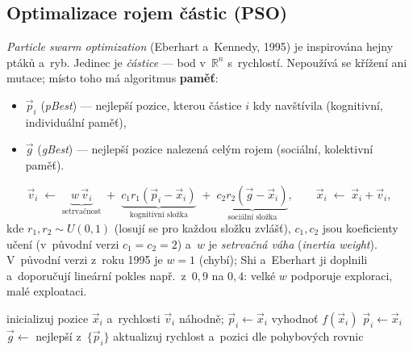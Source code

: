 \documentclass[11pt,a4paper]{article}
\theoremstyle{definition}
\begin{document}
\subsection{Optimalizace rojem částic (PSO)}

\emph{Particle swarm optimization} (Eberhart a~Kennedy, 1995) je inspirována
hejny ptáků a~ryb. Jedinec je \emph{částice} --- bod v~$\mathbb{R}^n$
s~rychlostí. Nepoužívá se křížení ani mutace; místo toho má algoritmus
\textbf{paměť}:
\begin{itemize}
\item $\vec p_i$ (\emph{pBest}) --- nejlepší pozice, kterou částice $i$
  kdy navštívila (kognitivní, individuální paměť),
\item $\vec g$ (\emph{gBest}) --- nejlepší pozice nalezená celým rojem
  (sociální, kolektivní paměť).
\end{itemize}

\begin{defbox}
\[
\vec v_i \;\gets\; \underbrace{w\,\vec v_i}_{\text{setrvačnost}}
\;+\; \underbrace{c_1 r_1 (\vec p_i - \vec x_i)}_{\text{kognitivní složka}}
\;+\; \underbrace{c_2 r_2 (\vec g - \vec x_i)}_{\text{sociální složka}},
\qquad
\vec x_i \;\gets\; \vec x_i + \vec v_i ,
\]
kde $r_1, r_2 \sim U(0,1)$ (losují se pro každou složku zvlášť),
$c_1, c_2$ jsou koeficienty učení (v~původní verzi $c_1 = c_2 = 2$)
a~$w$ je \emph{setrvačná váha} (\emph{inertia weight}).
V~původní verzi z~roku 1995 je $w = 1$ (chybí); Shi a~Eberhart ji doplnili
a~doporučují lineární pokles např.\ z~$0{,}9$ na $0{,}4$: velké $w$ podporuje
exploraci, malé exploataci.
\end{defbox}

\begin{algorithm}[!ht]
\caption{PSO}
\begin{algorithmic}[1]
\State inicializuj pozice $\vec x_i$ a~rychlosti $\vec v_i$ náhodně; $\vec p_i \gets \vec x_i$
\Repeat
    \State vyhodnoť $f(\vec x_i)$
     $\vec p_i \gets \vec x_i$ \EndIf
  \EndFor
  \State $\vec g \gets$ nejlepší z~$\{\vec p_i\}$
    \State aktualizuj rychlost a~pozici dle pohybových rovnic
  \EndFor
{}
\end{algorithmic}
\end{algorithm}
\end{document}
